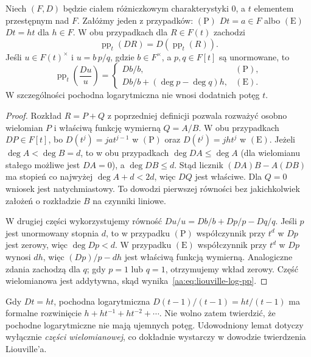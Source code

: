 \begin{lemat}
\label{aa:lem:liouville-polynomial-parts}
Niech $(F,D)$ będzie ciałem różniczkowym
charakterystyki $0$, a $t$ elementem przestępnym nad $F$.
Załóżmy jeden z przypadków: $(\mathrm P)$ $Dt=a\in F$
albo $(\mathrm E)$ $Dt=ht$ dla $h\in F$.
W obu przypadkach dla $R\in F(t)$ zachodzi
\[
 \operatorname{pp}_t(DR)=D(\operatorname{pp}_t(R)).
\]
Jeśli $u\in F(t)^\times$ i
$u=b\,p/q$, gdzie $b\in F^\times$, a $p,q\in F[t]$
są unormowane, to
\begin{equation}\label{aa:eq:liouville-log-pp}
 \operatorname{pp}_t\left(\frac{Du}{u}\right)
 =\begin{cases}
       Db/b,&(\mathrm P),\\
       Db/b+(\deg p-\deg q)h,&(\mathrm E).
   \end{cases}
\end{equation}
W szczególności pochodna logarytmiczna nie wnosi
dodatnich potęg $t$.
\end{lemat}
\begin{proof}
Rozkład $R=P+Q$ z poprzedniej definicji pozwala
rozważyć osobno wielomian $P$ i właściwą funkcję
wymierną $Q=A/B$. W obu przypadkach $DP\in F[t]$,
bo $D(t^j)=ja t^{j-1}$ w $(\mathrm P)$ oraz
$D(t^j)=jht^j$ w $(\mathrm E)$.
Jeżeli $\deg A<\deg B=d$, to w obu przypadkach
$\deg DA\le\deg A$ (dla wielomianu stałego możliwe
jest $DA=0$), a $\deg DB\le d$.
Stąd licznik $(DA)B-A(DB)$ ma stopień co najwyżej
$\deg A+d<2d$, więc $DQ$ jest właściwe.
Dla $Q=0$ wniosek jest natychmiastowy.
To dowodzi pierwszej równości bez jakichkolwiek
założeń o rozkładzie $B$ na czynniki liniowe.

W drugiej części wykorzystujemy równość
$Du/u=Db/b+Dp/p-Dq/q$. Jeśli $p$ jest
unormowany stopnia $d$, to w przypadku $(\mathrm P)$
współczynnik przy $t^d$ w $Dp$ jest zerowy,
więc $\deg Dp<d$. W przypadku $(\mathrm E)$
współczynnik przy $t^d$ w $Dp$ wynosi $dh$,
więc $(Dp)/p-dh$ jest właściwą funkcją wymierną.
Analogiczne zdania zachodzą dla $q$; gdy
$p=1$ lub $q=1$, otrzymujemy wkład zerowy.
Część wielomianowa jest addytywna, skąd
wynika~\eqref{aa:eq:liouville-log-pp}.
\end{proof}

\begin{uwaga}
\label{aa:uw:liouville-negative-powers}
Gdy $Dt=ht$, pochodna logarytmiczna
$D(t-1)/(t-1)=ht/(t-1)$ ma formalne rozwinięcie
$h+ht^{-1}+ht^{-2}+\cdots$. Nie wolno zatem
twierdzić, że pochodne logarytmiczne nie mają
ujemnych potęg. Udowodniony lemat dotyczy wyłącznie
\emph{części wielomianowej}, co dokładnie wystarczy
w dowodzie twierdzenia Liouville'a.
\end{uwaga}


